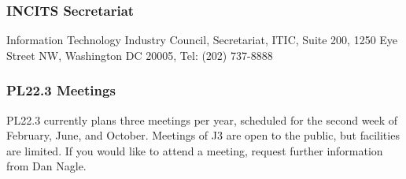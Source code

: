 \documentclass[10pt,letterpaper,twoside]{article}
\begin{document}
\subsubsection{INCITS Secretariat}

Information Technology Industry Council, Secretariat, ITIC, Suite 
200, 1250 Eye Street NW, Washington DC 20005, Tel: (202) 737-8888

\subsubsection{PL22.3 Meetings}

PL22.3 currently plans three meetings per year, scheduled for the 
second week of February, June, and October. Meetings of J3 are open 
to the public, but facilities are limited. If you would like to attend 
a meeting, request further information from Dan Nagle.
\end{document}

